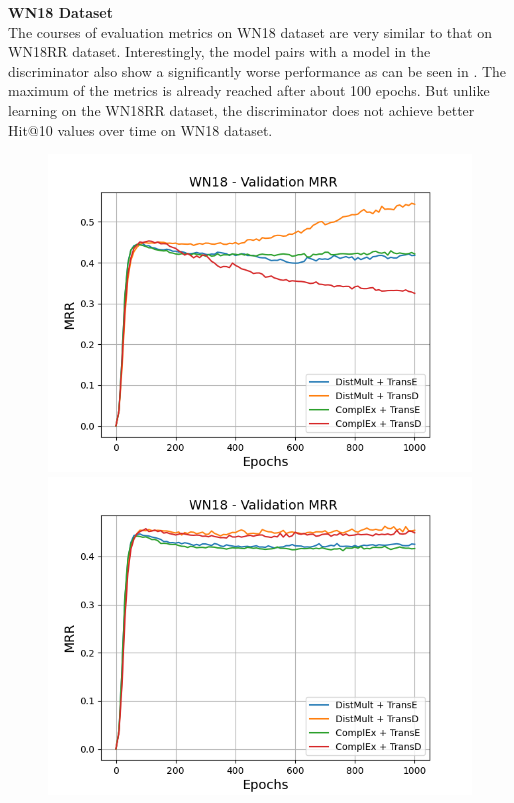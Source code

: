 \textbf{WN18 Dataset} 
\label{subsubsec:methods_wn18}\\
%
The courses of evaluation metrics on \textsc{WN18} dataset are very similar to that on \textsc{WN18RR} dataset.
Interestingly, the model pairs with a \transd model in the discriminator also show a significantly worse performance as can be seen in .
The maximum of the metrics is already reached after about 100 epochs.
But unlike learning on the \textsc{WN18RR} dataset, the discriminator does not achieve better Hit@10 values over time on \textsc{WN18} dataset.
\begin{figure}[H]
    \centering
    \begin{minipage}{.5\textwidth}
      \centering
      \includegraphics[width=0.9\linewidth]{figures/results/gan_train/not_pretrained/uncertainty/max/entropy/wn18/1k_epochs/uncertainty_wn18_mrrs.png}
    \end{minipage}%
    \begin{minipage}{.5\textwidth}
      \centering
      \includegraphics[width=0.9\linewidth]{figures/results/gan_train/not_pretrained/uncertainty/max_distribution/entropy/wn18/1k_epochs/uncertainty_wn18_mrrs.png}

\end{minipage}
\end{figure}
